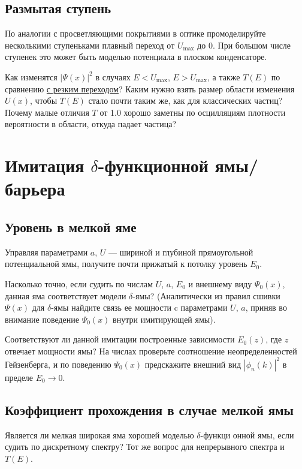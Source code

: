 \documentclass[12pt]{article}
\begin{document}

\hypertarget{smooth_step}{}\subsection{Размытая ступень}
По аналогии с просветляющими покрытиями в оптике промоделируйте несколькими ступеньками плавный переход от
$U_{\max}$ до 0. При большом числе ступенек это может быть моделью потенциала в плоском
конденсаторе.

Как изменятся  $|\Psi (x)|^2$ в случаях
$E<U_{\max}$, $E>U_{\max}$, а также $T(E)$ по сравнению \hyperlink{step_stationary} {с резким
переходом}?  Каким нужно  взять размер области изменения  $U(x)$,
чтобы $T(E)$  стало почти таким же,  как для классических частиц?
Почему малые отличия $T$ от 1.0 хорошо заметны по осцилляциям
плотности вероятности в области, откуда падает частица?


\hypertarget{delta-well}{}\section[Имитация дельта-функционной ямы/барьера]{Имитация $\delta$-функционной ямы/барьера}
\hypertarget{delta-well/E<0}{}\subsection{Уровень в мелкой яме}
Управляя параметрами $a$, $U$ --- шириной и глубиной прямоугольной
потенциальной ямы, получите почти прижатый к потолку уровень
$E_0$.

Насколько
точно, если судить по числам $U$, $a$, $E_0$ и внешнему виду
$\Psi_0 (x)$, данная яма соответствует модели $\delta$-ямы?
(Аналитически из правил сшивки $\Psi (x)$ для $\delta$-ямы
найдите связь ее мощности c параметрами $U$, $a$, приняв во
внимание  поведение $\Psi_0 (x)$ внутри имитирующей ямы).

Соответствуют ли данной имитации построенные зависимости $E_0(z)$, где $z$ отвечает мощности ямы? На числах проверьте соотношение
неопределенностей Гейзенберга, и по поведению $\Psi_0 (x)$
предскажите внешний вид $|\phi_n(k)|^2$ в пределе $E_0 \to 0$.


\hypertarget{delta-well/E>0}{}\subsection{Коэффициент прохождения
в случае мелкой ямы}
Является ли мелкая широкая яма хорошей моделью  $\delta$-функци\-
он\-ной  ямы, если судить по дискретному спектру?  Тот же
вопрос для непрерывного спектра и $T(E)$.
\end{document}
